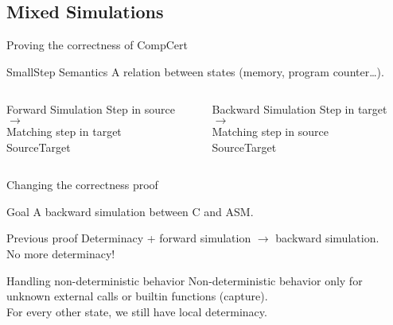 \subsection{Mixed Simulations}
\begin{frame}{Proving the correctness of CompCert}
  \begin{block}{SmallStep Semantics}
    A relation between states (memory, program counter\dots).
  \end{block}
  \vfill
  \begin{columns}[T] %
    \begin{column}{.48\textwidth}
      \begin{block}{Forward Simulation}
        Step in source $\rightarrow$\\ Matching step in target\\
        {\color{blue}Source\hfill\color{red}Target}
        \forward
      \end{block}
    \end{column}%
    \hfill%
    \begin{column}{.48\textwidth}
      \begin{block}{Backward Simulation}
        Step in target $\rightarrow$\\ Matching step in source\\
        {\color{blue}Source\hfill\color{red}Target}
        \backward
      \end{block}
    \end{column}%
  \end{columns}
\end{frame}

\begin{frame}{Changing the correctness proof}
  \begin{exampleblock}{Goal}
    A backward simulation between C and ASM.
  \end{exampleblock}
  \vfill
  \begin{alertblock}{Previous proof}
    Determinacy + forward simulation $\rightarrow$ backward simulation.\\
    No more determinacy!
  \end{alertblock}
  \vfill
  \begin{exampleblock}{Handling non-deterministic behavior}
    Non-deterministic behavior only for unknown external calls or builtin functions (capture).\\
    For every other state, we still have local determinacy.
  \end{exampleblock}
\end{frame}

